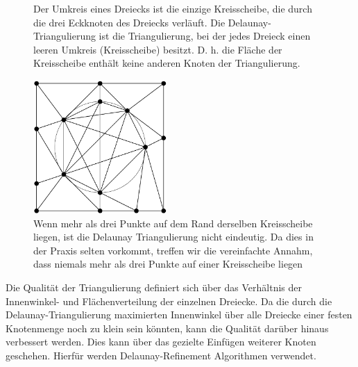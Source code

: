 \begin{figure}[H]%
    \centering
  
  \caption{Der Umkreis eines Dreiecks ist die einzige Kreisscheibe, die durch die drei Eckknoten des Dreiecks verläuft. Die Delaunay-Triangulierung ist die Triangulierung, bei der jedes Dreieck einen leeren Umkreis (Kreisscheibe) besitzt. D. h. die Fläche der Kreisscheibe enthält keine anderen Knoten der Triangulierung. \cite{Gjacquenot:2013:delaunay-circumcircles}}
  \label{fig:delaunay_umkreis}
\end{figure}
    
    
\begin{figure}[H]
    \centering
    \includegraphics[width=2in]{images/Bildschirmfoto von 2021-11-27 22-34-40.png}
    \caption{ Wenn mehr als drei Punkte auf dem Rand derselben Kreisscheibe liegen, ist die Delaunay Triangulierung nicht eindeutig. Da dies in der  Praxis selten vorkommt, treffen wir die vereinfachte Annahm, dass niemals mehr als drei Punkte auf einer Kreisscheibe liegen~\cite{shewchuk:1997:delaunay} }
    \label{fig:eindeutig}
\end{figure}
    
\newpage

Die Qualität der Triangulierung definiert sich über das Verhältnis der  Innenwinkel- und Flächenverteilung der einzelnen Dreiecke. 
Da die durch die Delaunay-Triangulierung maximierten Innenwinkel über alle Dreiecke einer festen Knotenmenge noch zu klein sein könnten, 
kann die Qualität darüber hinaus verbessert werden. Dies kann über das gezielte Einfügen weiterer Knoten geschehen. Hierfür werden Delaunay-Refinement Algorithmen verwendet.\\

 





